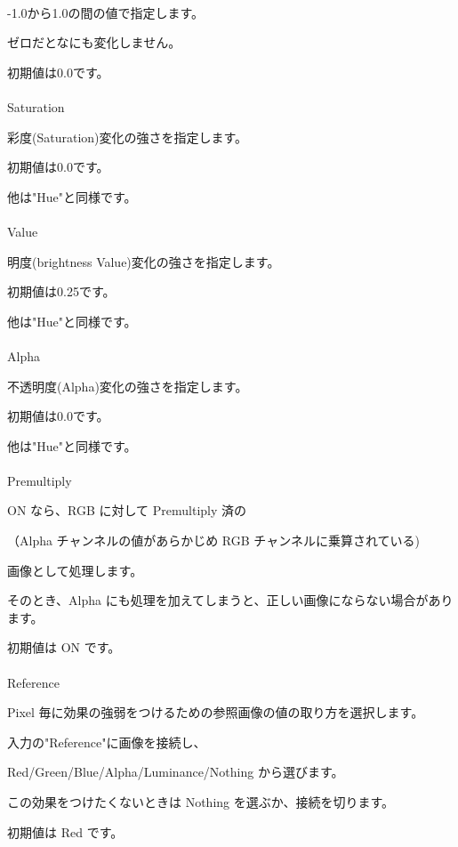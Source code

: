 \documentclass[a4paper,12pt]{article}
\begin{document}
\newpage

\thispagestyle{empty}

\ \vspace{-0.2em}
\par
-1.0から1.0の間の値で指定します。\par
ゼロだとなにも変化しません。\par
初期値は0.0です。\\
\\
Saturation\par
彩度(Saturation)変化の強さを指定します。\par
初期値は0.0です。\par
他は"Hue"と同様です。\\
\\
Value\par
明度(brightness Value)変化の強さを指定します。\par
初期値は0.25です。\par
他は"Hue"と同様です。\\
\\
Alpha\par
不透明度(Alpha)変化の強さを指定します。\par
初期値は0.0です。\par
他は"Hue"と同様です。\\
\\
Premultiply\par
ON なら、RGB に対して Premultiply 済の\par
（Alpha チャンネルの値があらかじめ RGB チャンネルに乗算されている)\par
画像として処理します。\par
そのとき、Alpha にも処理を加えてしまうと、正しい画像にならない場合があります。\par
初期値は ON です。\\
\\
Reference\par
Pixel 毎に効果の強弱をつけるための参照画像の値の取り方を選択します。\par
入力の"Reference"に画像を接続し、\par
Red/Green/Blue/Alpha/Luminance/Nothing から選びます。\par
この効果をつけたくないときは Nothing を選ぶか、接続を切ります。\par
初期値は Red です。
\end{document}

